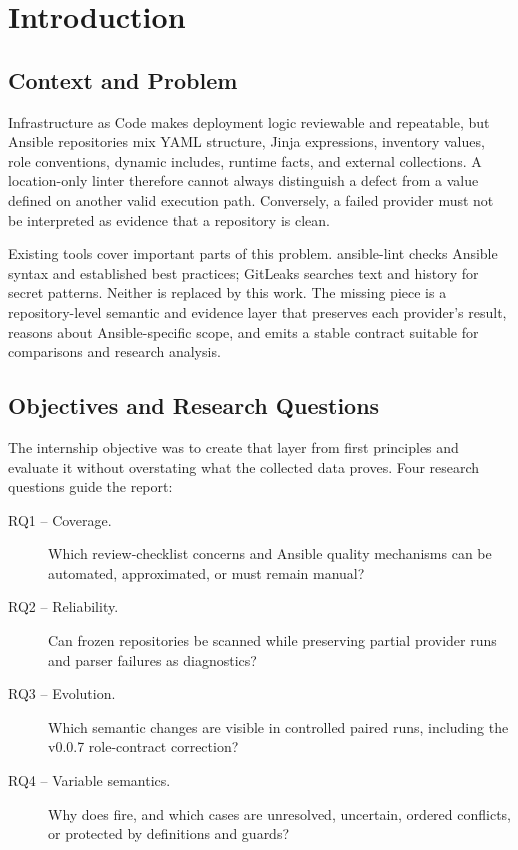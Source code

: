 \chapter{Introduction}
\label{chap:introduction}

\section{Context and Problem}
Infrastructure as Code makes deployment logic reviewable and repeatable, but
Ansible repositories mix YAML structure, Jinja expressions, inventory values,
role conventions, dynamic includes, runtime facts, and external collections.
A location-only linter therefore cannot always distinguish a defect from a
value defined on another valid execution path. Conversely, a failed provider
must not be interpreted as evidence that a repository is clean.

Existing tools cover important parts of this problem. ansible-lint checks
Ansible syntax and established best practices; GitLeaks searches text and
history for secret patterns. Neither is replaced by this work. The missing
piece is a repository-level semantic and evidence layer that preserves each
provider's result, reasons about Ansible-specific scope, and emits a stable
contract suitable for comparisons and research analysis.

\section{Objectives and Research Questions}
The internship objective was to create that layer from first principles and
evaluate it without overstating what the collected data proves. Four research
questions guide the report:
\begin{description}
  \item[RQ1 -- Coverage.] Which review-checklist concerns and Ansible quality
    mechanisms can be automated, approximated, or must remain manual?
  \item[RQ2 -- Reliability.] Can frozen repositories be scanned while
    preserving partial provider runs and parser failures as diagnostics?
  \item[RQ3 -- Evolution.] Which semantic changes are visible in controlled
    paired runs, including the v0.0.7 role-contract correction?
  \item[RQ4 -- Variable semantics.] Why does  fire,
    and which cases are unresolved, uncertain, ordered conflicts, or protected
    by definitions and guards?
\end{description}

